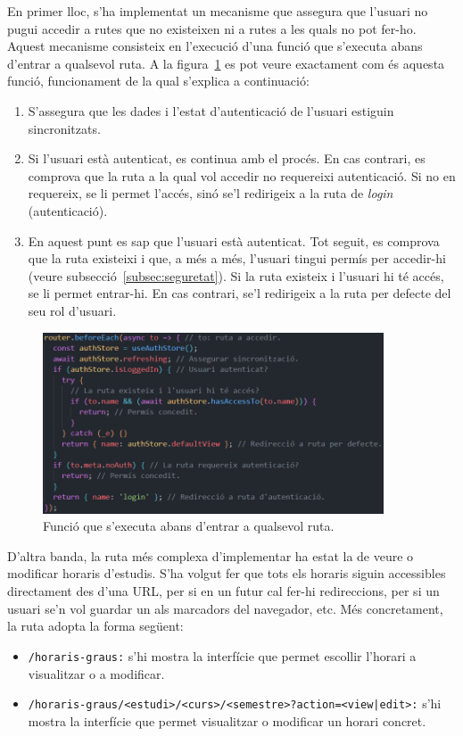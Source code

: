 \documentclass[a4paper,12pt]{ThesisStyle}
\begin{document}
En primer lloc, s'ha implementat un mecanisme que assegura que l'usuari no pugui accedir a rutes que no existeixen ni a rutes a les quals no pot fer-ho. Aquest mecanisme consisteix en l'execució d'una funció que s'executa abans d'entrar a qualsevol ruta. A la figura~\ref{img:beforeEach} es pot veure exactament com és aquesta funció, funcionament de la qual s'explica a continuació:
\begin{enumerate}
  \item S'assegura que les dades i l'estat d'autenticació de l'usuari estiguin sincronitzats.
  \item Si l'usuari està autenticat, es continua amb el procés. En cas contrari, es comprova que la ruta a la qual vol accedir no requereixi autenticació. Si no en requereix, se li permet l'accés, sinó se'l redirigeix a la ruta de \textit{login} (autenticació).
  \item En aquest punt es sap que l'usuari està autenticat. Tot seguit, es comprova que la ruta existeixi i que, a més a més, l'usuari tingui permís per accedir-hi (veure subsecció~\ref{subsec:seguretat}). Si la ruta existeix i l'usuari hi té accés, se li permet entrar-hi. En cas contrari, se'l redirigeix a la ruta per defecte del seu rol d'usuari.
\end{enumerate}

\begin{figure}[H]
  \centering
  \includegraphics[width=0.9\textwidth]{assets/code/enrutamentClient/beforeEach.png}
  \caption{\label{img:beforeEach} Funció que s'executa abans d'entrar a qualsevol ruta.}
\end{figure}

\newpage

D'altra banda, la ruta més complexa d'implementar ha estat la de veure o modificar horaris d'estudis. S'ha volgut fer que tots els horaris siguin accessibles directament des d'una URL, per si en un futur cal fer-hi redireccions, per si un usuari se'n vol guardar un als marcadors del navegador, etc. Més concretament, la ruta adopta la forma següent:
\begin{itemize}
  \item \texttt{/horaris-graus:} s'hi mostra la interfície que permet escollir l'horari a visualitzar o a modificar.
  \item \texttt{/horaris-graus/<estudi>/<curs>/<semestre>?action=<view|edit>:} s'hi mostra la interfície que permet visualitzar o modificar un horari concret.
\end{itemize}
\end{document}
